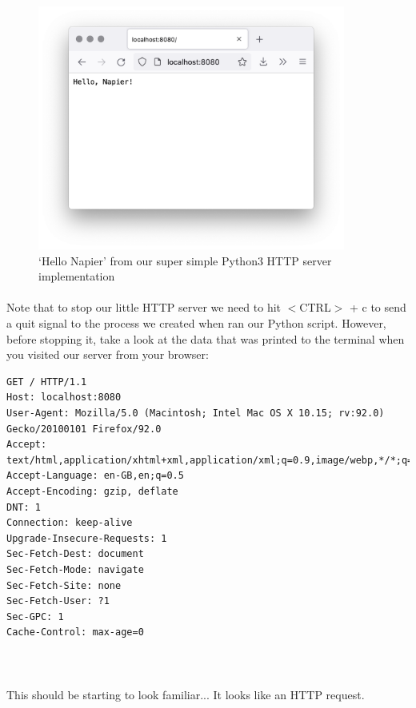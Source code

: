 \begin{figure}[H]
\centering
\includegraphics[width=0.9\textwidth]{images/http-simplest.png}
\caption{`Hello Napier' from our super simple Python3 HTTP server implementation}
\label{fig:http-simplest}
\end{figure}

\paragraph{} Note that to stop our little HTTP server we need to hit $<$CTRL$>$ + c to send a quit signal to the process we created when ran our Python script. However, before stopping it, take a look at the data that was printed to the terminal when you visited our server from your browser:

\begin{lstlisting}[style=DOS]
GET / HTTP/1.1
Host: localhost:8080
User-Agent: Mozilla/5.0 (Macintosh; Intel Mac OS X 10.15; rv:92.0) Gecko/20100101 Firefox/92.0
Accept: text/html,application/xhtml+xml,application/xml;q=0.9,image/webp,*/*;q=0.8
Accept-Language: en-GB,en;q=0.5
Accept-Encoding: gzip, deflate
DNT: 1
Connection: keep-alive
Upgrade-Insecure-Requests: 1
Sec-Fetch-Dest: document
Sec-Fetch-Mode: navigate
Sec-Fetch-Site: none
Sec-Fetch-User: ?1
Sec-GPC: 1
Cache-Control: max-age=0



\end{lstlisting}

\paragraph{} This should be starting to look familiar... It looks like an HTTP request.


